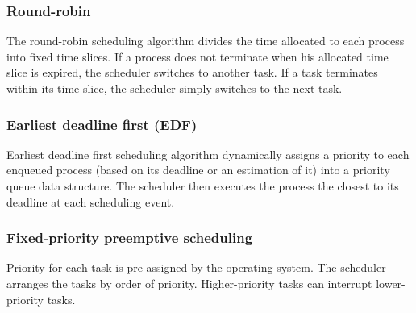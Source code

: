 \subsubsection{Round-robin}
The round-robin scheduling algorithm divides the time allocated to each process into fixed time slices.
If a process does not terminate when his allocated time slice is expired, the scheduler switches to another task.
If a task terminates within its time slice, the scheduler simply switches to the next task.

\subsubsection{Earliest deadline first (EDF)}
Earliest deadline first scheduling algorithm dynamically assigns a priority
    to each enqueued process (based on its deadline or an estimation of it) into a priority queue data structure.
The scheduler then executes the process the closest to its deadline at each scheduling event.

\subsubsection{Fixed-priority preemptive scheduling}
Priority for each task is pre-assigned by the operating system.
The scheduler arranges the tasks by order of priority.
Higher-priority tasks can interrupt lower-priority tasks\cite{Operatin47:online}.


